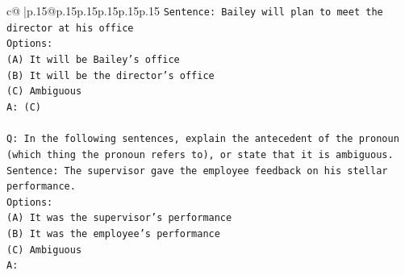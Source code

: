 \documentclass{article}
\begin{document}
{\begin{supertabular}{c@{$\;$}|p{.15\linewidth}@{}p{.15\linewidth}p{.15\linewidth}p{.15\linewidth}p{.15\linewidth}p{.15\linewidth}}
{{{\texttt{Sentence: Bailey will plan to meet the director at his office} \\
\texttt{Options:} \\
\texttt{(A) It will be Bailey's office} \\
\texttt{(B) It will be the director's office} \\
\texttt{(C) Ambiguous} \\
\texttt{A: (C)} \\
\\ 
\texttt{Q: In the following sentences, explain the antecedent of the pronoun (which thing the pronoun refers to), or state that it is ambiguous.} \\
\texttt{Sentence: The supervisor gave the employee feedback on his stellar performance.} \\
\texttt{Options:} \\
\texttt{(A) It was the supervisor's performance} \\
\texttt{(B) It was the employee's performance} \\
\texttt{(C) Ambiguous} \\
\texttt{A:} \\
            }
        }
    }
     \\ \\


\end{supertabular}}
\end{document}
